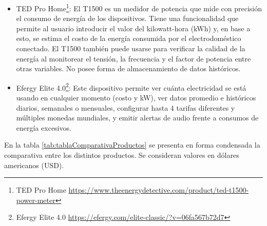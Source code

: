 \begin{itemize}
    \item TED Pro Home\footnote{TED Pro Home \url{https://www.theenergydetective.com/product/ted-t1500-power-meter}}:
    El T1500 es un medidor de potencia que mide con precisión el consumo de energía de los dispositivos. Tiene una funcionalidad que permite al usuario introducir el valor del kilowatt-hora (kWh) y, en base a esto, se estima el costo de la energía consumida por el electrodoméstico conectado. El T1500 también puede usarse para verificar la calidad de la energía al monitorear el tensión, la frecuencia y el factor de potencia entre otras variables. No posee forma de almacenamiento de datos históricos.

    \item Efergy Elite 4.0\footnote{Efergy Elite 4.0 \url{https://efergy.com/elite-classic/?v=06fa567b72d7}}:
    Este dispositivo permite ver cuánta electricidad se está usando en cualquier momento (costo y kW), ver datos promedio e históricos diarios, semanales o mensuales, configurar hasta 4 tarifas diferentes y múltiples monedas mundiales, y emitir alertas de audio frente a consumos de energía excesivos.
\end{itemize}

En la tabla \ref{tab:tablaComparativaProductos} se presenta en forma condensada la comparativa entre los distintos productos. Se consideran valores en dólares americanos (USD).

